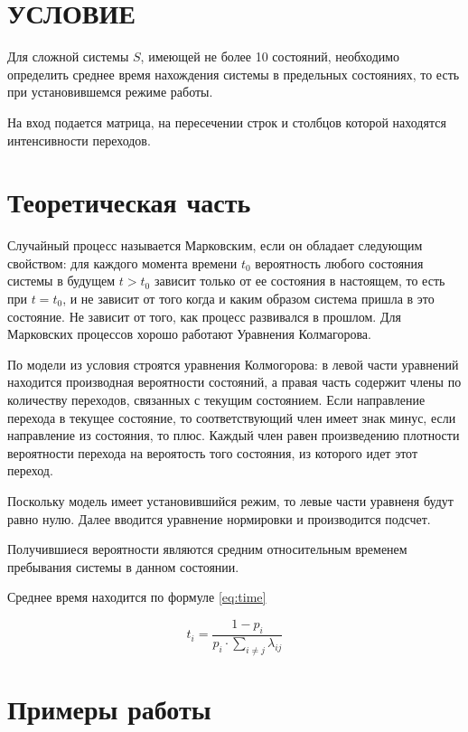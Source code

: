 \chapter*{\hfill{}УСЛОВИЕ\hfill{}}

Для сложной системы $S$, имеющей не более 10 состояний, необходимо определить среднее время нахождения системы в предельных состояниях, то есть при установившемся режиме работы.

На вход подается матрица, на пересечении строк и столбцов которой находятся интенсивности переходов.

\chapter{Теоретическая часть}%

Случайный процесс называется Марковским, если он обладает следующим свойством: для каждого момента времени $t_0$ вероятность любого состояния системы в будущем $t > t_0$ зависит только от ее состояния в настоящем, то есть при $t = t_0$, и не зависит от того когда и каким образом система пришла в это состояние. Не зависит от того, как процесс развивался в прошлом. Для Марковских процессов хорошо работают Уравнения Колмагорова.

По модели из условия строятся уравнения Колмогорова: в левой части уравнений находится производная вероятности состояний, а правая часть содержит члены по количеству переходов, связанных с текущим состоянием. Если направление перехода в текущее состояние, то соответствующий член имеет знак минус, если направление из состояния, то плюс. Каждый член равен произведению плотности вероятности перехода на вероятость того состояния, из которого идет этот переход.

Поскольку модель имеет установившийся режим, то левые части уравненя будут равно нулю. Далее вводится уравнение нормировки и производится подсчет.

Получившиеся вероятности являются средним относительным временем пребывания системы в данном состоянии.

Среднее время находится по формуле \ref{eq:time}

\begin{equation}\label{eq:time}
    t_i = \frac{1 - p_i}{p_i \cdot \sum_{i \ne j}\lambda_{ij}}
\end{equation}

\chapter{Примеры работы}

